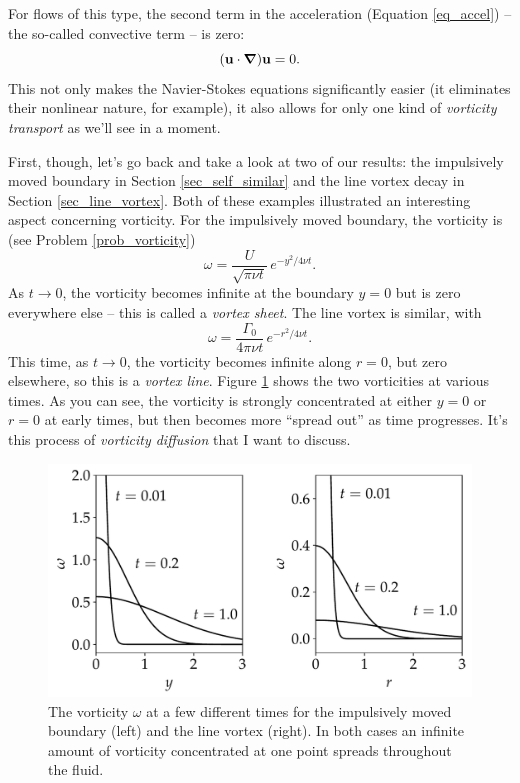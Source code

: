 For flows of this type, the second term in the acceleration (Equation \ref{eq_accel}) -- the so-called convective term -- is zero:
\[
(\mathbf{u} \cdot \boldsymbol{\nabla}) \mathbf{u} = 0.
\]
This not only makes the Navier-Stokes equations significantly easier (it eliminates their nonlinear nature, for example), it also allows for only one kind of \emph{vorticity transport} as we'll see in a moment.

First, though, let's go back and take a look at two of our results:  the impulsively moved boundary in Section \ref{sec_self_similar} and the line vortex decay in Section \ref{sec_line_vortex}.  Both of these examples illustrated an interesting aspect concerning vorticity.  For the impulsively moved boundary, the vorticity is (see Problem \ref{prob_vorticity})
\begin{equation}
\label{eq_vort_1}
\omega = \frac{U}{\sqrt{\pi \nu t}} \, e^{-y^2 / 4 \nu t}.
\end{equation}
As $t \to 0$, the vorticity becomes infinite at the boundary $y=0$ but is zero everywhere else -- this is called a \emph{vortex sheet}.  The line vortex is similar, with 
\begin{equation}
\label{eq_vort_2}
\omega = \frac{\Gamma_0}{4\pi \nu t} \, e^{-r^2 / 4 \nu t}.
\end{equation}
This time, as $t \to 0$, the vorticity becomes infinite along $r=0$, but zero elsewhere, so this is a \emph{vortex line}.  Figure \ref{fig_vorticity_transport} shows the two vorticities at various times.  As you can see, the vorticity is strongly concentrated at either $y=0$ or $r=0$ at early times, but then becomes more ``spread out'' as time progresses.  It's this process of \emph{vorticity diffusion} that I want to discuss.

\begin{figure}
\centering
\includegraphics[width=0.8\linewidth]{Figures/Chapter2/fig_vorticity_transport}
\caption{The vorticity $\omega$ at a few different times for the impulsively moved boundary (left) and the line vortex (right).  In both cases an infinite amount of vorticity concentrated at one point spreads throughout the fluid.}
\label{fig_vorticity_transport}
\end{figure}

